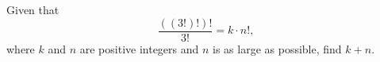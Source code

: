Given that
\[ \frac{((3!)!)!}{3!} = k \cdot n!, \]
where $k$ and $n$ are positive integers and $n$ is as large as possible, find $k + n$.